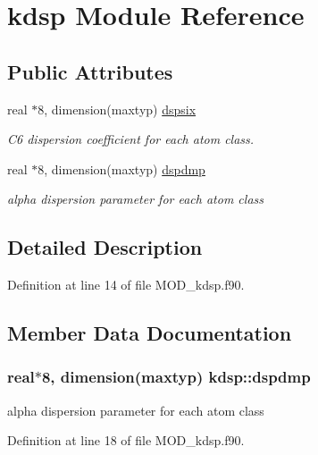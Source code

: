 \hypertarget{classkdsp}{\section{kdsp Module Reference}
\label{classkdsp}
}
\subsection*{Public Attributes}
\begin{DoxyCompactItemize}
\item 
real $\ast$8, dimension(maxtyp) \hyperlink{classkdsp_aba76ed1bb9b7b80e0f4549d0028f82c8}{dspsix}
\begin{DoxyCompactList}\small\item\em C6 dispersion coefficient for each atom class. \end{DoxyCompactList}\item 
real $\ast$8, dimension(maxtyp) \hyperlink{classkdsp_a8a876bcc6411fe56b861c5fd568a09c4}{dspdmp}
\begin{DoxyCompactList}\small\item\em alpha dispersion parameter for each atom class \end{DoxyCompactList}\end{DoxyCompactItemize}


\subsection{Detailed Description}


Definition at line 14 of file M\-O\-D\-\_\-kdsp.\-f90.



\subsection{Member Data Documentation}
\hypertarget{classkdsp_a8a876bcc6411fe56b861c5fd568a09c4}{
\subsubsection[{dspdmp}]{\setlength{\rightskip}{0pt plus 5cm}real$\ast$8, dimension(maxtyp) kdsp\-::dspdmp}}\label{classkdsp_a8a876bcc6411fe56b861c5fd568a09c4}


alpha dispersion parameter for each atom class 



Definition at line 18 of file M\-O\-D\-\_\-kdsp.\-f90.

